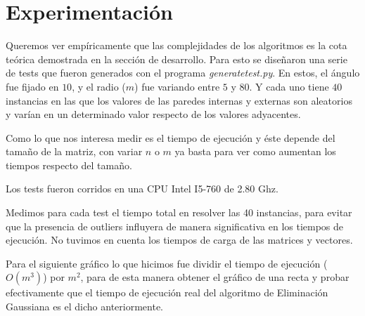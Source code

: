 \section{Experimentación}

Queremos ver empíricamente que las complejidades de los algoritmos es la cota teórica demostrada en la sección de desarrollo. Para esto se diseñaron una serie de tests que fueron generados con el programa \textit{generatetest.py}. En estos, el ángulo fue fijado en $10$, y el radio ($m$) fue variando entre $5$ y $80$.
Y cada uno tiene $40$ instancias en las que los valores de las paredes internas y externas son aleatorios y varían en un determinado valor respecto de los valores adyacentes.

Como lo que nos interesa medir es el tiempo de ejecución y éste depende del tamaño de la matriz, con variar $n$ o $m$ ya basta para ver como aumentan los tiempos respecto del tamaño.

Los tests fueron corridos en una CPU Intel I5-760 de 2.80 Ghz.

Medimos para cada test el tiempo total en resolver las 40 instancias, para evitar que la presencia de outliers influyera de manera significativa en los tiempos de ejecución. No tuvimos en cuenta los tiempos de carga de las matrices y vectores.

Para el siguiente gráfico lo que hicimos fue dividir el tiempo de ejecución ($O(m^{3})$) por $m^{2}$, para de esta manera obtener el gráfico de una recta y probar efectivamente que el tiempo de ejecución real del algoritmo de Eliminación Gaussiana es el dicho anteriormente.

